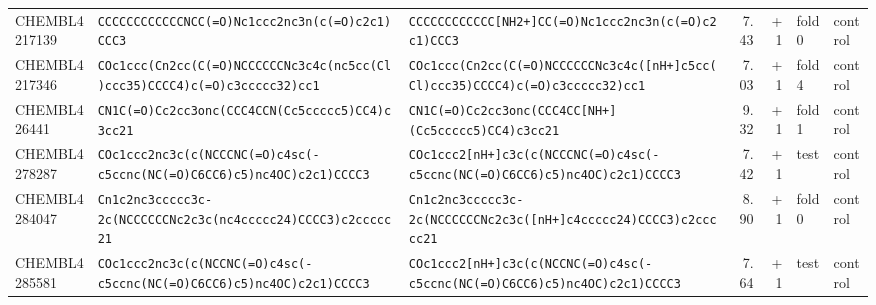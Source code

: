 \begin{longtable}{l p{4.4cm} p{4.4cm} r r l l}
CHEMBL4217139 & \texttt{CCCCCCCCCCCCNCC(\allowbreak{}=\allowbreak{}O)\allowbreak{}Nc1ccc2nc3n(\allowbreak{}c(\allowbreak{}=\allowbreak{}O)\allowbreak{}c2c1)\allowbreak{}CCC3} & \texttt{CCCCCCCCCCCC[NH2+]\allowbreak{}CC(\allowbreak{}=\allowbreak{}O)\allowbreak{}Nc1ccc2nc3n(\allowbreak{}c(\allowbreak{}=\allowbreak{}O)\allowbreak{}c2c1)\allowbreak{}CCC3} & 7.43 & +1 & fold 0 & control \\
CHEMBL4217346 & \texttt{COc1ccc(\allowbreak{}Cn2cc(\allowbreak{}C(\allowbreak{}=\allowbreak{}O)\allowbreak{}NCCCCCCNc3c4c(\allowbreak{}nc5cc(\allowbreak{}Cl)\allowbreak{}ccc35)\allowbreak{}CCCC4)\allowbreak{}c(\allowbreak{}=\allowbreak{}O)\allowbreak{}c3ccccc32)\allowbreak{}cc1} & \texttt{COc1ccc(\allowbreak{}Cn2cc(\allowbreak{}C(\allowbreak{}=\allowbreak{}O)\allowbreak{}NCCCCCCNc3c4c(\allowbreak{}[nH+]\allowbreak{}c5cc(\allowbreak{}Cl)\allowbreak{}ccc35)\allowbreak{}CCCC4)\allowbreak{}c(\allowbreak{}=\allowbreak{}O)\allowbreak{}c3ccccc32)\allowbreak{}cc1} & 7.03 & +1 & fold 4 & control \\
CHEMBL426441 & \texttt{CN1C(\allowbreak{}=\allowbreak{}O)\allowbreak{}Cc2cc3onc(\allowbreak{}CCC4CCN(\allowbreak{}Cc5ccccc5)\allowbreak{}CC4)\allowbreak{}c3cc21} & \texttt{CN1C(\allowbreak{}=\allowbreak{}O)\allowbreak{}Cc2cc3onc(\allowbreak{}CCC4CC[NH+]\allowbreak{}(\allowbreak{}Cc5ccccc5)\allowbreak{}CC4)\allowbreak{}c3cc21} & 9.32 & +1 & fold 1 & control \\
CHEMBL4278287 & \texttt{COc1ccc2nc3c(\allowbreak{}c(\allowbreak{}NCCCNC(\allowbreak{}=\allowbreak{}O)\allowbreak{}c4sc(\allowbreak{}-c5ccnc(\allowbreak{}NC(\allowbreak{}=\allowbreak{}O)\allowbreak{}C6CC6)\allowbreak{}c5)\allowbreak{}nc4OC)\allowbreak{}c2c1)\allowbreak{}CCCC3} & \texttt{COc1ccc2[nH+]\allowbreak{}c3c(\allowbreak{}c(\allowbreak{}NCCCNC(\allowbreak{}=\allowbreak{}O)\allowbreak{}c4sc(\allowbreak{}-c5ccnc(\allowbreak{}NC(\allowbreak{}=\allowbreak{}O)\allowbreak{}C6CC6)\allowbreak{}c5)\allowbreak{}nc4OC)\allowbreak{}c2c1)\allowbreak{}CCCC3} & 7.42 & +1 & test & control \\
CHEMBL4284047 & \texttt{Cn1c2nc3ccccc3c-2c(\allowbreak{}NCCCCCCNc2c3c(\allowbreak{}nc4ccccc24)\allowbreak{}CCCC3)\allowbreak{}c2ccccc21} & \texttt{Cn1c2nc3ccccc3c-2c(\allowbreak{}NCCCCCCNc2c3c(\allowbreak{}[nH+]\allowbreak{}c4ccccc24)\allowbreak{}CCCC3)\allowbreak{}c2ccccc21} & 8.90 & +1 & fold 0 & control \\
CHEMBL4285581 & \texttt{COc1ccc2nc3c(\allowbreak{}c(\allowbreak{}NCCNC(\allowbreak{}=\allowbreak{}O)\allowbreak{}c4sc(\allowbreak{}-c5ccnc(\allowbreak{}NC(\allowbreak{}=\allowbreak{}O)\allowbreak{}C6CC6)\allowbreak{}c5)\allowbreak{}nc4OC)\allowbreak{}c2c1)\allowbreak{}CCCC3} & \texttt{COc1ccc2[nH+]\allowbreak{}c3c(\allowbreak{}c(\allowbreak{}NCCNC(\allowbreak{}=\allowbreak{}O)\allowbreak{}c4sc(\allowbreak{}-c5ccnc(\allowbreak{}NC(\allowbreak{}=\allowbreak{}O)\allowbreak{}C6CC6)\allowbreak{}c5)\allowbreak{}nc4OC)\allowbreak{}c2c1)\allowbreak{}CCCC3} & 7.64 & +1 & test & control \\

\end{longtable}
